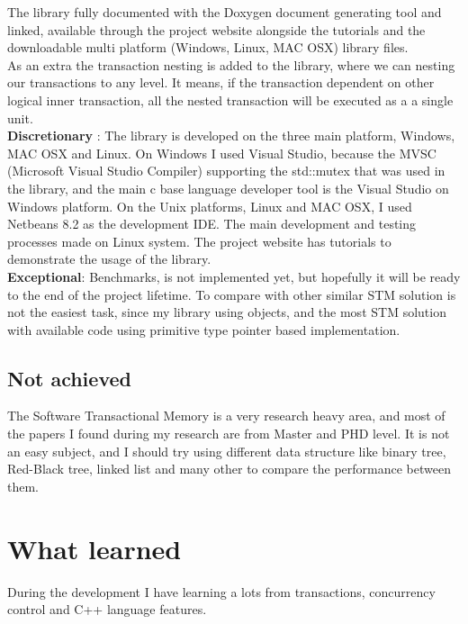 \documentclass[12pt]{article}
\begin{document}
The library fully documented with the Doxygen document generating tool and linked, available through the project website alongside the tutorials and the downloadable multi platform (Windows, Linux, MAC OSX) library files.\\

As an extra the transaction nesting is added to the library, where we can nesting our transactions to any level. It means, if the transaction dependent on other logical inner transaction, all the nested transaction will be executed as a a single unit.\\

\textbf{Discretionary} : The library is developed on the three main platform, Windows, MAC OSX and Linux. On Windows I used Visual Studio, because the MVSC (Microsoft Visual Studio Compiler) supporting the std::mutex that was used in the library, and the main c base language developer tool is the Visual Studio on Windows platform. On the Unix platforms, Linux and MAC OSX, I used Netbeans 8.2 as the development IDE. The main development and testing processes made on Linux system. The project website has tutorials to demonstrate the usage of the library.\\

\textbf{Exceptional}: Benchmarks, is not implemented yet, but hopefully it will be ready to the end of the project lifetime. To compare with other similar STM solution is not the easiest task, since my library using objects, and the most STM solution with available code using primitive type pointer based implementation. 

\subsection{Not achieved}
The Software Transactional Memory is a very research heavy area, and most of the papers I found during my research are from Master and PHD level. It is not an easy subject, and I should try using different data structure like binary tree, Red-Black tree, linked list and many other to compare the performance between them.\\


\newpage
\section{What learned}
During the development I have learning a lots from transactions, concurrency control and C++ language features.
\end{document}
